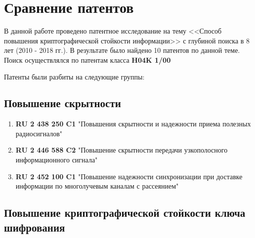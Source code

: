 \section{Сравнение патентов}

В данной работе проведено патентное исследование на тему <<Способ повышения криптографической стойкости информации>> с глубиной поиска в 8 лет (2010 - 2018 гг.). В результате было найдено 10 патентов по данной теме. Поиск осуществлялся по патентам класса \textbf{H04K 1/00}

Патенты были разбиты на следующие группы:

\subsection{Повышение скрытности}

\begin{enumerate}
    
\item \textbf{RU 2 438 250 C1} "Повышения скрытности и надежности приема полезных радиосигналов"

\item \textbf{RU 2 446 588 C2} "Повышение скрытности передачи узкополосного информационного сигнала"

\item \textbf{RU 2 452 100 C1} "Повышение надежности синхронизации при доставке информации по многолучевым каналам с рассеянием"
 
\end{enumerate}



\subsection{Повышение криптографической стойкости ключа шифрования}

